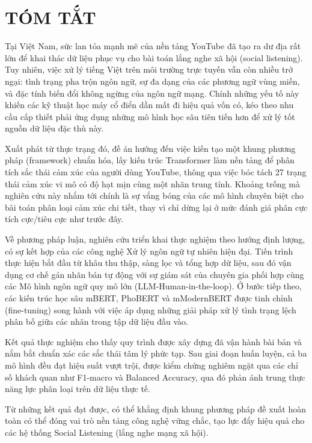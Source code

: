 \chapter*{TÓM TẮT}
\label{tomtat}
Tại Việt Nam, sức lan tỏa mạnh mẽ của nền tảng YouTube đã tạo ra dư địa rất lớn để khai thác dữ liệu phục vụ cho bài toán lắng nghe xã hội (social listening). Tuy nhiên, việc xử lý tiếng Việt trên môi trường trực tuyến vẫn còn nhiều trở ngại: tình trạng pha trộn ngôn ngữ, sự đa dạng của các phương ngữ vùng miền, và đặc tính biến đổi không ngừng của ngôn ngữ mạng. Chính những yếu tố này khiến các kỹ thuật học máy cổ điển dần mất đi hiệu quả vốn có, kéo theo nhu cầu cấp thiết phải ứng dụng những mô hình học sâu tiên tiến hơn để xử lý tốt nguồn dữ liệu đặc thù này.

Xuất phát từ thực trạng đó, đề án hướng đến việc kiến tạo một khung phương pháp (framework) chuẩn hóa, lấy kiến trúc Transformer làm nền tảng để phân tích sắc thái cảm xúc của người dùng YouTube, thông qua việc bóc tách 27 trạng thái cảm xúc vi mô có độ hạt mịn cùng một nhãn trung tính. Khoảng trống mà nghiên cứu này nhắm tới chính là sự vắng bóng của các mô hình chuyên biệt cho bài toán phân loại cảm xúc chi tiết, thay vì chỉ dừng lại ở mức đánh giá phân cực tích cực/tiêu cực như trước đây.

Về phương pháp luận, nghiên cứu triển khai thực nghiệm theo hướng định lượng, có sự kết hợp của các công nghệ Xử lý ngôn ngữ tự nhiên hiện đại. Tiến trình thực hiện bắt đầu từ khâu thu thập, sàng lọc và tổng hợp dữ liệu, sau đó vận dụng cơ chế gán nhãn bán tự động với sự giám sát của chuyên gia phối hợp cùng các Mô hình ngôn ngữ quy mô lớn (LLM-Human-in-the-loop). Ở bước tiếp theo, các kiến trúc học sâu mBERT, PhoBERT và mModernBERT được tinh chỉnh (fine-tuning) song hành với việc áp dụng những giải pháp xử lý tình trạng lệch phân bố giữa các nhãn trong tập dữ liệu đầu vào.

Kết quả thực nghiệm cho thấy quy trình được xây dựng đã vận hành bài bản và nắm bắt chuẩn xác các sắc thái tâm lý phức tạp. Sau giai đoạn huấn luyện, cả ba mô hình đều đạt hiệu suất vượt trội, được kiểm chứng nghiêm ngặt qua các chỉ số khách quan như F1-macro và Balanced Accuracy, qua đó phản ánh trung thực năng lực phân loại trên dữ liệu thực tế.

Từ những kết quả đạt được, có thể khẳng định khung phương pháp đề xuất hoàn toàn có thể đóng vai trò nền tảng công nghệ vững chắc, tạo lực đẩy hiệu quả cho các hệ thống Social Listening (lắng nghe mạng xã hội).

